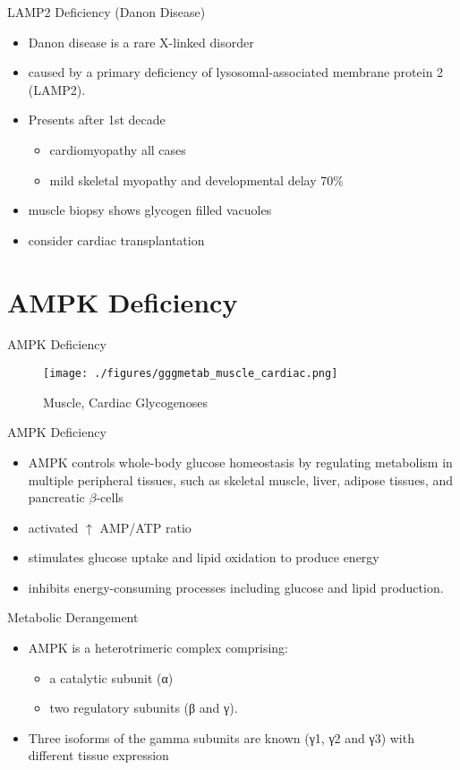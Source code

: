 \documentclass[presentation, smaller]{beamer}
\begin{document}
\begin{frame}[label={sec:orgd4e7571}]{LAMP2 Deficiency (Danon Disease)}
\begin{itemize}
\item Danon disease is a rare X-linked disorder
\item caused by a primary deficiency of lysosomal-associated membrane
protein 2 (LAMP2).
\item Presents after 1st decade
\begin{itemize}
\item cardiomyopathy all cases
\item mild skeletal myopathy and developmental delay 70\%
\end{itemize}
\item muscle biopsy shows glycogen filled vacuoles
\item consider cardiac transplantation
\end{itemize}
\end{frame}

\section{AMPK Deficiency}
\label{sec:org0d8eabf}
\begin{frame}[label={sec:orgfdc169f}]{AMPK Deficiency}
\begin{figure}[htbp]
\centering
\texttt{[image: ./figures/gggmetab\_muscle\_cardiac.png]}
\caption[Muscle, Cardiac Glycogenoses]{\label{fig:org02a25af}
Muscle, Cardiac Glycogenoses}
\end{figure}
\end{frame}

\begin{frame}[label={sec:org7c31e08}]{AMPK Deficiency}
\begin{itemize}
\item AMPK controls whole-body glucose homeostasis by regulating metabolism in multiple peripheral tissues, such as
skeletal muscle, liver, adipose tissues, and pancreatic \(\beta\)-cells
\item activated \(\uparrow\) AMP/ATP ratio
\item stimulates glucose uptake and lipid oxidation to produce energy
\item inhibits energy-consuming processes including glucose and lipid production.
\end{itemize}
\end{frame}

\begin{frame}[label={sec:org1db1a6f}]{Metabolic Derangement}
\begin{itemize}
\item AMPK is a heterotrimeric complex comprising:
\begin{itemize}
\item a catalytic subunit (α)
\item two regulatory subunits (β and γ).
\end{itemize}
\item Three isoforms of the gamma subunits are known (γ1, γ2 and γ3) with different tissue
expression
\end{itemize}
\end{frame}
\end{document}

